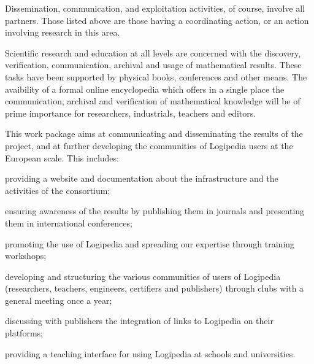\begin{workpackage}[id=dissemination,type=MGT,wphases=1-48,
  short={Dissemination},
  title={Dissemination, communication and exploitation},
  lead=Lie,LieRM=1,InrRM=6,BirRM=4,CleRM=2,ImtRM=2,StrRM=2,ZibRM=14,EduRM=12]

  Dissemination, communication, and exploitation activities, of course,
  involve all partners. Those listed above are those having a coordinating
  action, or an action involving research in this area.

  \begin{wpobjectives}
    Scientific research and education at all levels are concerned with
    the discovery, verification, communication, archival and usage of
    mathematical results. These tasks have been supported by physical
    books, conferences and other means. The avaibility of a formal
    online encyclopedia which offers in a single place the
    communication, archival and verification of mathematical knowledge
    will be of prime importance for researchers, industrials, teachers
    and editors.

    This work package aims at communicating and disseminating the
    results of the project, and at further developing the communities
    of Logipedia users at the European scale. This includes:
    \begin{compactitem}
    \item providing a website and documentation about the
      infrastructure and the activities of the consortium;
    \item ensuring awareness of the results by publishing them in
      journals and presenting them in international conferences;
    \item promoting the use of Logipedia and spreading our expertise
      through training workshops;
    \item developing and structuring the various communities of users
      of Logipedia (researchers, teachers, engineers, certifiers and
      publishers) through clubs with a general meeting once a year;
    \item discussing with publishers the integration of links to
      Logipedia on their platforms;
    \item providing a teaching interface for using Logipedia at
      schools and universities.
    \end{compactitem}
  \end{wpobjectives}



\end{workpackage}
